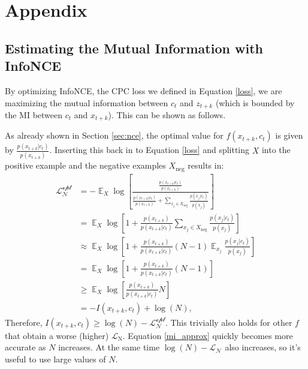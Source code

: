 \appendix

\newpage
\section{Appendix}

\subsection{Estimating the Mutual Information with InfoNCE}

By optimizing InfoNCE, the CPC loss we defined in Equation \ref{loss}, we are maximizing the mutual information between $c_t$ and $z_{t+k}$ (which is bounded by the MI between $c_t$ and $x_{t+k}$). This can be shown as follows.

As already shown in Section \ref{sec:nce}, the optimal value for $f(x_{t+k}, c_{t})$ is given by $\frac{p(x_{t+k}|c_{t})}{p(x_{t+k})}$. Inserting this back in to Equation \ref{loss} and splitting $X$ into the positive example and the negative examples $X_{\text{neg}}$ results in:
\begin{align}
\mathcal{L^{\text{opt}}_{\text{N}}} &= - \mathop{{}\mathbb{E}}_{X} \log\left[  \frac{\frac{p(x_{t+k}|c_{t})}{p(x_{t+k})}}{\frac{p(x_{t+k}|c_{t})}{p(x_{t+k})} + \sum_{x_j \in X_{\text{neg}}} \frac{p(x_{j}|c_{t})}{p(x_{j})}}\right] \\
&= \mathop{{}\mathbb{E}}_{X}\log\left[1 + \frac{p(x_{t+k})}{p(x_{t+k}|c_{t})} \sum_{x_j \in X_{\text{neg}}} \frac{p(x_{j}|c_{t})}{p(x_{j})}\right] \\
&\approx \mathop{{}\mathbb{E}}_{X}\log\left[1 + \frac{p(x_{t+k})}{p(x_{t+k}|c_{t})} (N-1) \mathop{{}\mathbb{E}}_{x_j} \frac{p(x_{j}|c_{t})}{p(x_{j})}\right] \label{mi_approx} \\
&= \mathop{{}\mathbb{E}}_{X}\log\left[1 + \frac{p(x_{t+k})}{p(x_{t+k}|c_{t})} (N-1)\right] \\
&\geq \mathop{{}\mathbb{E}}_{X}\log\left[\frac{p(x_{t+k})}{p(x_{t+k}|c_{t})} N\right] \label{mi_ineq} \\
&= - I(x_{t+k}, c_t) + \log(N),
\end{align}
Therefore, $I(x_{t+k}, c_t)\geq \log(N) - \mathcal{L^{\text{opt}}_{\text{N}}}$. This trivially also holds for other $f$ that obtain a worse (higher) $\mathcal{L}_{\text{N}}$. Equation \ref{mi_approx} quickly becomes more accurate as $N$ increases. At the same time $\log(N) - \mathcal{L_{\text{N}}}$ also increases, so it's useful to use large values of $N$. %

